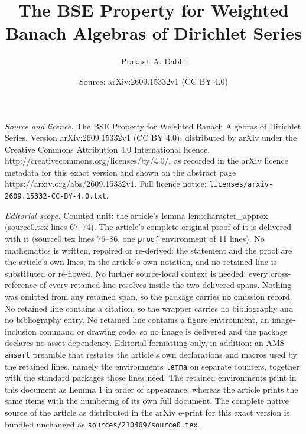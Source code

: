 \documentclass[10pt,a4paper]{amsart}
\title{The BSE Property for Weighted Banach Algebras of Dirichlet Series}
\author{Prakash A. Dabhi}
\date{Source: arXiv:2609.15332v1 (CC BY 4.0)}
\begin{document}
\maketitle

\noindent\emph{Source and licence.} The BSE Property for Weighted Banach Algebras of Dirichlet Series. Version arXiv:2609.15332v1 (CC BY 4.0), distributed by arXiv under the Creative Commons Attribution 4.0 International licence, http://creativecommons.org/licenses/by/4.0/, as recorded in the arXiv licence metadata for this exact version and shown on the abstract page https://arxiv.org/abs/2609.15332v1. Full licence notice: \texttt{licenses/arxiv-2609.15332-CC-BY-4.0.txt}.\par\smallskip

\noindent\textit{Editorial scope.} Counted unit: the article's lemma lem:character\_approx (source0.tex lines 67--74). The article's complete original proof of it is delivered with it (source0.tex lines 76--86, one \texttt{proof} environment of 11 lines). No mathematics is written, repaired or re-derived: the statement and the proof are the article's own lines, in the article's own notation, and no retained line is substituted or re-flowed.  No further source-local context is needed: every cross-reference of every retained line resolves inside the two delivered spans.  Nothing was omitted from any retained span, so the package carries no omission record.  No retained line contains a citation, so the wrapper carries no bibliography and no bibliography entry.  No retained line contains a figure environment, an image-inclusion command or drawing code, so no image is delivered and the package declares no asset dependency.  Editorial formatting only, in addition: an AMS \texttt{amsart} preamble that restates the article's own declarations and macros used by the retained lines, namely the environments \texttt{lemma} on separate counters, together with the standard packages those lines need.  The retained environments print in this document as Lemma 1 in order of appearance, whereas the article prints the same items with the numbering of its own full document.  The complete native source of the article as distributed in the arXiv e-print for this exact version is bundled unchanged as \texttt{sources/210409/source0.tex}.
\end{document}
